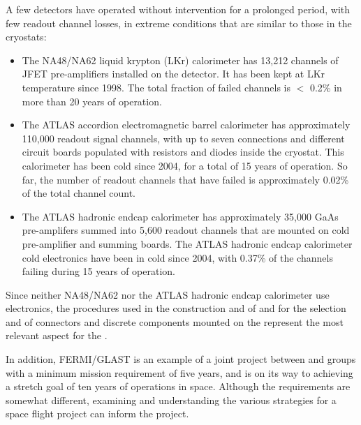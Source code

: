 A few  detectors have operated without intervention for a 
prolonged period, with few readout channel losses, in extreme 
conditions that are similar to those in the   cryostats:
\begin{itemize}
\item The NA48/NA62 liquid krypton (LKr) calorimeter has 13,212 channels 
of JFET pre-amplifiers installed on the detector. It has been kept at LKr temperature 
since 1998. The total fraction of failed channels is $<$ 0.2\% in more than \num{20} years of operation.
\item The ATLAS  accordion electromagnetic barrel calorimeter has 
approximately 110,000 readout signal channels, with up to seven connections and different 
circuit boards populated with resistors and diodes inside the cryostat. This
calorimeter has been cold since 2004, for a total of \num{15} years of operation. So far, the
number of readout channels that have failed is approximately 0.02\% of the total channel count.
\item The ATLAS  hadronic endcap calorimeter has approximately 35,000 GaAs
pre-amplifers summed into 5,600 readout channels that are mounted on cold pre-amplifier
and summing boards. The ATLAS  hadronic endcap 
calorimeter cold electronics have been in cold since 2004, with
0.37\% of the channels failing during 15 years of operation. 
\end{itemize}
Since neither NA48/NA62 nor the ATLAS  hadronic endcap calorimeter
use  electronics, the procedures used in the construction and  of  and 
for the selection and  of connectors and discrete components mounted
on the  represent the most relevant aspect for the  .

In addition, FERMI/GLAST is an example of a joint project between  and  groups 
with a minimum mission requirement of five years, and is on its way to achieving a 
stretch goal of ten years of operations in space. Although the requirements are somewhat 
different, examining and understanding the various strategies for a space 
flight project can inform the  project. 


